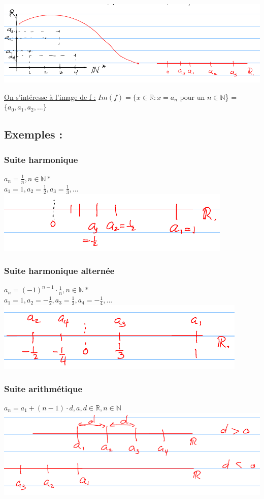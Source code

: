 \documentclass[12pt,a4paper]{article}
\newcommand{\R}{\ensuremath{\mathbb{R}} }
\newcommand{\N}{\ensuremath{\mathbb{N}} }
\begin{document}
{\includegraphics[scale=0.65]{illustrations_Analyse/graphe_suite}

\underline{On s'intéresse à l'image de f :} $Im(f) = \{x \in \R : x = a_n$ pour un $n \in \N$\} = $\{a_0,a_1,a_2,...\}$
\subsection{Exemples :}
\subsubsection{Suite harmonique}
$a_n = \frac{1}{n}, n \in  \mathbb{N*}$\\
$a_1 = 1, a_2 = \frac{1}{2}, a_3 = \frac{1}{3},...$\\
\includegraphics[scale=1]{illustrations_Analyse/suite_harmonique}
\subsubsection{Suite harmonique alternée}
$a_n = (-1)^{n-1}\cdot\frac{1}{n}, n \in \mathbb{N*}$\\
$a_1 = 1, a_2 = -\frac{1}{2}, a_3 = \frac{1}{3}, a_4 = -\frac{1}{4},...$\\
\includegraphics[scale=1]{illustrations_Analyse/suite_harmonique_alternee}
\subsubsection{Suite arithmétique}
$a_n  =a_1 + (n-1)\cdot d, a,d \in\R, n \in \N$\\
\includegraphics[scale=1]{illustrations_Analyse/suite_arithmetique}
}
\end{document}

